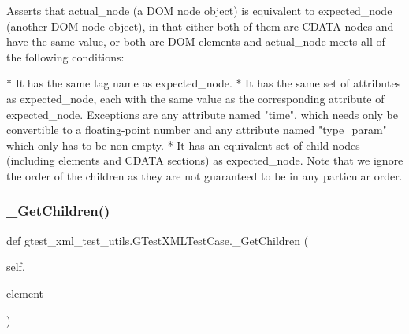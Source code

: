\begin{DoxyVerb}Asserts that actual_node (a DOM node object) is equivalent to
expected_node (another DOM node object), in that either both of
them are CDATA nodes and have the same value, or both are DOM
elements and actual_node meets all of the following conditions:

*  It has the same tag name as expected_node.
*  It has the same set of attributes as expected_node, each with
   the same value as the corresponding attribute of expected_node.
   Exceptions are any attribute named "time", which needs only be
   convertible to a floating-point number and any attribute named
   "type_param" which only has to be non-empty.
*  It has an equivalent set of child nodes (including elements and
   CDATA sections) as expected_node.  Note that we ignore the
   order of the children as they are not guaranteed to be in any
   particular order.
\end{DoxyVerb}
 \mbox{\label{classgtest__xml__test__utils_1_1_g_test_x_m_l_test_case_a7f487435d29e1b2300af000d36ff4f5e}} 
\subsubsection{\texorpdfstring{\+\_\+\+Get\+Children()}{\_GetChildren()}}
{\footnotesize\ttfamily def gtest\+\_\+xml\+\_\+test\+\_\+utils.\+G\+Test\+X\+M\+L\+Test\+Case.\+\_\+\+Get\+Children (\begin{DoxyParamCaption}\item[{}]{self,  }\item[{}]{element }\end{DoxyParamCaption})\hspace{0.3cm}{\ttfamily [private]}}

